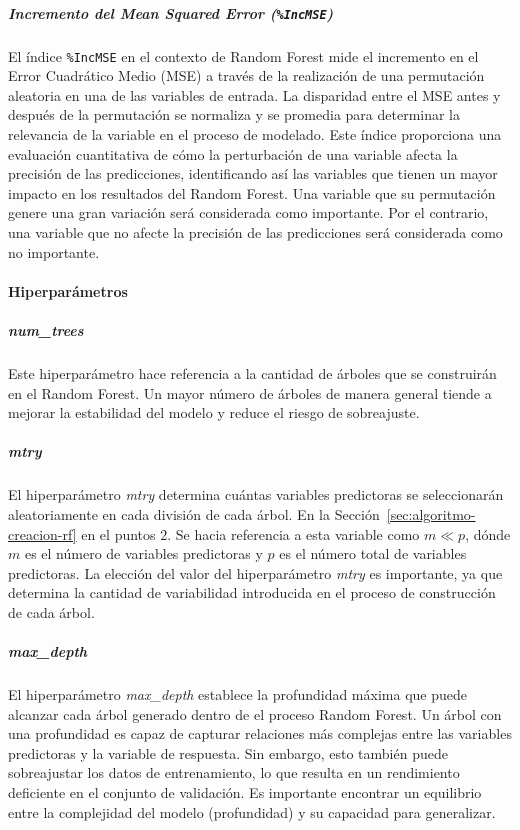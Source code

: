 \subparagraph{Incremento del Mean Squared Error (\texttt{\%IncMSE})}

El índice \texttt{\%IncMSE} en el contexto de Random Forest mide el incremento en el Error Cuadrático Medio (MSE) a través de la realización de una permutación aleatoria en una de las variables de entrada. La disparidad entre el MSE antes y después de la permutación se normaliza y se promedia para determinar la relevancia de la variable en el proceso de modelado. Este índice proporciona una evaluación cuantitativa de cómo la perturbación de una variable afecta la precisión de las predicciones, identificando así las variables que tienen un mayor impacto en los resultados del Random Forest. Una variable que su permutación genere una gran variación será considerada como importante. Por el contrario, una variable que no afecte la precisión de las predicciones será considerada como no importante.

\paragraph{Hiperparámetros}\label{sec:importancia-variables}

\subparagraph{\textit{num\_trees}}

Este hiperparámetro hace referencia a la cantidad de árboles que se construirán en el Random Forest. Un mayor número de árboles de manera general tiende a mejorar la estabilidad del modelo y reduce el riesgo de sobreajuste.

\subparagraph{\textit{mtry}}

El hiperparámetro \textit{mtry} determina cuántas variables predictoras se seleccionarán aleatoriamente en cada división de cada árbol. En la Sección~\ref{sec:algoritmo-creacion-rf} en el puntos $2$. Se hacia referencia a esta variable como  \(m \ll p\), dónde \(m\) es el número de variables predictoras y \(p\) es el número total de variables predictoras. La elección del valor del hiperparámetro  \textit{mtry} es importante, ya que determina la cantidad de variabilidad introducida en el proceso de construcción de cada árbol. 

\subparagraph{\textit{max\_depth}}
El hiperparámetro \textit{max\_depth} establece la profundidad máxima que puede alcanzar cada árbol generado dentro de el proceso Random Forest. Un árbol con una profundidad es capaz de capturar relaciones más complejas entre las variables predictoras y la variable de respuesta. Sin embargo, esto también puede sobreajustar los datos de entrenamiento, lo que resulta en un rendimiento deficiente en el conjunto de validación. Es importante encontrar un equilibrio entre la complejidad del modelo (profundidad) y su capacidad para generalizar.

